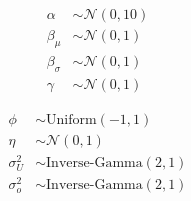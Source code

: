 \documentclass[
  letterpaper,
  DIV=11,
  numbers=noendperiod]{scrartcl}
\begin{document}
\begin{subequations}
\begin{align}
\alpha &\sim \mathcal{N}(0, 10) \\ 
\beta_{\mu} &\sim \mathcal{N}(0, 1) \\
\beta_{\sigma} &\sim \mathcal{N}(0, 1) \\ 
\gamma &\sim \mathcal{N}(0, 1)
\end{align}
\end{subequations}

\begin{subequations}
\begin{align}
\phi &\sim \text{Uniform}(-1, 1) \\ 
\eta &\sim \mathcal{N}(0, 1)  \\ 
\sigma_U^2 &\sim \text{Inverse-Gamma}(2, 1) \\
\sigma_o^2 &\sim \text{Inverse-Gamma}(2, 1) 
\end{align}
\end{subequations}
\end{document}
